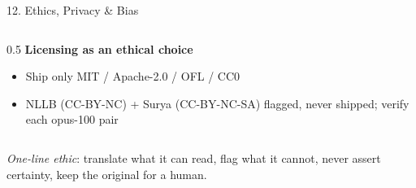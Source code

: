 \documentclass[10pt,aspectratio=169]{beamer}
\begin{document}
\begin{frame}{12. Ethics, Privacy \& Bias}
\begin{columns}[T]
\begin{column}{0.5\textwidth}
\textbf{Licensing as an ethical choice}
\begin{itemize}\scriptsize
  \item Ship only MIT / Apache-2.0 / OFL / CC0
  \item NLLB (CC-BY-NC) + Surya (CC-BY-NC-SA) flagged, never shipped; verify each opus-100 pair
\end{itemize}
\end{column}
\end{columns}

\vspace{0.08cm}
\scriptsize \emph{One-line ethic}: translate what it can read, flag what it cannot, never assert certainty, keep the original for a human.
\end{frame}

\end{document}
